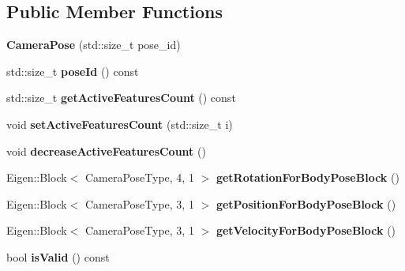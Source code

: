 \subsection*{Public Member Functions}
\begin{DoxyCompactItemize}
\item 
\hypertarget{class_camera_pose_a9393e875cfde4b1587a5f8b06d498466}{{\bfseries Camera\-Pose} (std\-::size\-\_\-t pose\-\_\-id)}\label{class_camera_pose_a9393e875cfde4b1587a5f8b06d498466}

\item 
\hypertarget{class_camera_pose_a91fe393ed7bd9c638198a7e138e3926c}{std\-::size\-\_\-t {\bfseries pose\-Id} () const }\label{class_camera_pose_a91fe393ed7bd9c638198a7e138e3926c}

\item 
\hypertarget{class_camera_pose_ab690a1975e061c75e2431c2f671d5637}{std\-::size\-\_\-t {\bfseries get\-Active\-Features\-Count} () const }\label{class_camera_pose_ab690a1975e061c75e2431c2f671d5637}

\item 
\hypertarget{class_camera_pose_ad52f534b1a0b4841a4c8d5e04471f0a1}{void {\bfseries set\-Active\-Features\-Count} (std\-::size\-\_\-t i)}\label{class_camera_pose_ad52f534b1a0b4841a4c8d5e04471f0a1}

\item 
\hypertarget{class_camera_pose_acfe976d10448deee4b714506c3ab6357}{void {\bfseries decrease\-Active\-Features\-Count} ()}\label{class_camera_pose_acfe976d10448deee4b714506c3ab6357}

\item 
\hypertarget{class_camera_pose_adeec70b16372d5aede066da2b6bf5d4a}{Eigen\-::\-Block$<$ Camera\-Pose\-Type, 4, 1 $>$ {\bfseries get\-Rotation\-For\-Body\-Pose\-Block} ()}\label{class_camera_pose_adeec70b16372d5aede066da2b6bf5d4a}

\item 
\hypertarget{class_camera_pose_af518728cc70c31460a20fc0f6f3f40a4}{Eigen\-::\-Block$<$ Camera\-Pose\-Type, 3, 1 $>$ {\bfseries get\-Position\-For\-Body\-Pose\-Block} ()}\label{class_camera_pose_af518728cc70c31460a20fc0f6f3f40a4}

\item 
\hypertarget{class_camera_pose_ae15933c2b5176d011135164962639a99}{Eigen\-::\-Block$<$ Camera\-Pose\-Type, 3, 1 $>$ {\bfseries get\-Velocity\-For\-Body\-Pose\-Block} ()}\label{class_camera_pose_ae15933c2b5176d011135164962639a99}

\item 
\hypertarget{class_camera_pose_aea5ef3206eb4f8929495dfc8f3a93571}{bool {\bfseries is\-Valid} () const }\label{class_camera_pose_aea5ef3206eb4f8929495dfc8f3a93571}

\end{DoxyCompactItemize}



